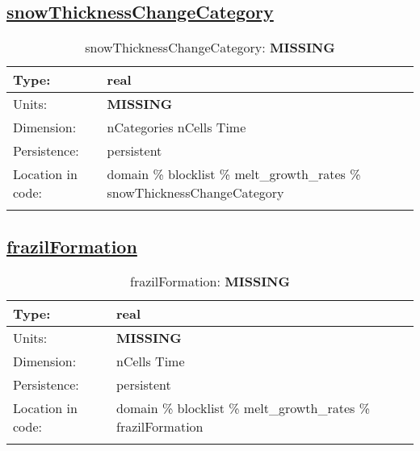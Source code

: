 \subsection[snowThicknessChangeCategory]{\hyperref[sec:var_tab_melt_growth_rates]{snowThicknessChangeCategory}}
\label{subsec:var_sec_melt_growth_rates_snowThicknessChangeCategory}
\begin{center}
\begin{longtable}{| p{2.0in} | p{4.0in} |}
        \hline 
        Type: & real \\
        \hline 
        Units: & {\bf \color{red} MISSING} \\
        \hline 
        Dimension: & nCategories nCells Time \\
        \hline 
        Persistence: & persistent \\
        \hline 
         Location in code: & domain \% blocklist \% melt\_growth\_rates \% snowThicknessChangeCategory \\
         \hline 
    \caption{snowThicknessChangeCategory: {\bf \color{red} MISSING}}
\end{longtable}
\end{center}
\subsection[frazilFormation]{\hyperref[sec:var_tab_melt_growth_rates]{frazilFormation}}
\label{subsec:var_sec_melt_growth_rates_frazilFormation}
\begin{center}
\begin{longtable}{| p{2.0in} | p{4.0in} |}
        \hline 
        Type: & real \\
        \hline 
        Units: & {\bf \color{red} MISSING} \\
        \hline 
        Dimension: & nCells Time \\
        \hline 
        Persistence: & persistent \\
        \hline 
         Location in code: & domain \% blocklist \% melt\_growth\_rates \% frazilFormation \\
         \hline 
    \caption{frazilFormation: {\bf \color{red} MISSING}}
\end{longtable}
\end{center}
